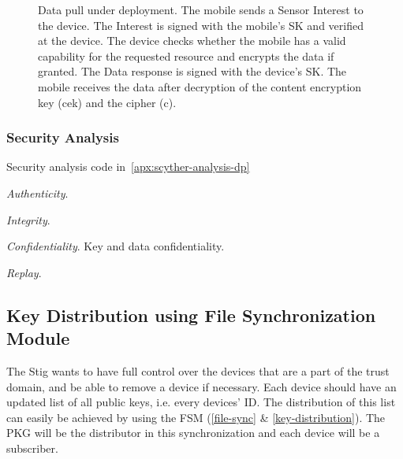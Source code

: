 \begin{figure}[H]
  \caption{Data pull under deployment. 
  The mobile sends a Sensor Interest to the device. 
  The Interest is signed with the mobile's SK and verified at the device. 
  The device checks whether the mobile has a valid capability for the requested resource and encrypts the data if granted.
  The Data response is signed with the device's SK.
  The mobile receives the data after decryption of the content encryption key (cek) and the cipher (c).}
  \label{fig:data_pull_ibe}
\end{figure}


\subsubsection{Security Analysis}
Security analysis code in~\autoref{apx:scyther-analysis-dp}

\textit{Authenticity}.

\textit{Integrity}.

\textit{Confidentiality}. Key and data confidentiality.

\textit{Replay}.

\subsection{Key Distribution using File Synchronization Module}

The Stig wants to have full control over the devices that are a part of the trust domain, and be able to remove a device if necessary.
Each device should have an updated list of all public keys, i.e. every devices' \gls{ID}.
The distribution of this list can easily be achieved by using the \gls{FSM} (\autoref{file-sync} \& \autoref{key-distribution}).
The \gls{PKG} will be the distributor in this synchronization and each device will be a subscriber.



